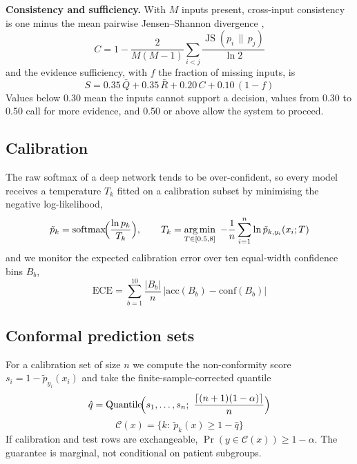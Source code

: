 \documentclass[conference]{IEEEtran}
\DeclareMathOperator*{\argmin}{arg\,min}
\DeclareMathOperator{\softmax}{softmax}
\DeclareMathOperator{\JS}{JS}
\begin{document}
\textbf{Consistency and sufficiency.} With $M$ inputs present, cross-input consistency is one minus the mean pairwise Jensen--Shannon divergence \cite{lin1991},
\begin{equation}
C=1-\frac{2}{M(M-1)}\sum_{i<j}\frac{\JS(p_i\,\|\,p_j)}{\ln 2}
\label{eq:C}
\end{equation}
and the evidence sufficiency, with $f$ the fraction of missing inputs, is
\begin{equation}
S=0.35\,\bar Q+0.35\,\bar R+0.20\,C+0.10\,(1-f)
\label{eq:S}
\end{equation}
Values below 0.30 mean the inputs cannot support a decision, values from 0.30 to 0.50 call for more evidence, and 0.50 or above allow the system to proceed.

\subsection{Calibration}
The raw softmax of a deep network tends to be over-confident, so every model receives a temperature $T_k$ fitted on a calibration subset by minimising the negative log-likelihood,
\begin{equation}
\tilde p_k=\softmax\!\Bigl(\frac{\ln p_k}{T_k}\Bigr),\qquad
T_k=\argmin_{T\in[0.5,8]}\ -\frac1n\sum_{i=1}^{n}\ln\tilde p_{k,y_i}(x_i;T)
\label{eq:T}
\end{equation}
and we monitor the expected calibration error over ten equal-width confidence bins $B_b$,
\begin{equation}
\mathrm{ECE}=\sum_{b=1}^{10}\frac{|B_b|}{n}\,\bigl|\mathrm{acc}(B_b)-\mathrm{conf}(B_b)\bigr|
\label{eq:ece}
\end{equation}

\subsection{Conformal prediction sets}
For a calibration set of size $n$ we compute the non-conformity score $s_i=1-\tilde p_{y_i}(x_i)$ and take the finite-sample-corrected quantile \cite{vovk2005,angelopoulos2021}
\begin{equation}
\hat q=\mathrm{Quantile}\!\Bigl(s_1,\dots,s_n;\ \frac{\lceil (n+1)(1-\alpha)\rceil}{n}\Bigr)
\label{eq:q}
\end{equation}
\begin{equation}
\mathcal C(x)=\bigl\{k:\ \tilde p_k(x)\ge 1-\hat q\bigr\}
\label{eq:set}
\end{equation}
If calibration and test rows are exchangeable, $\Pr(y\in\mathcal C(x))\ge 1-\alpha$. The guarantee is marginal, not conditional on patient subgroups.
\end{document}
